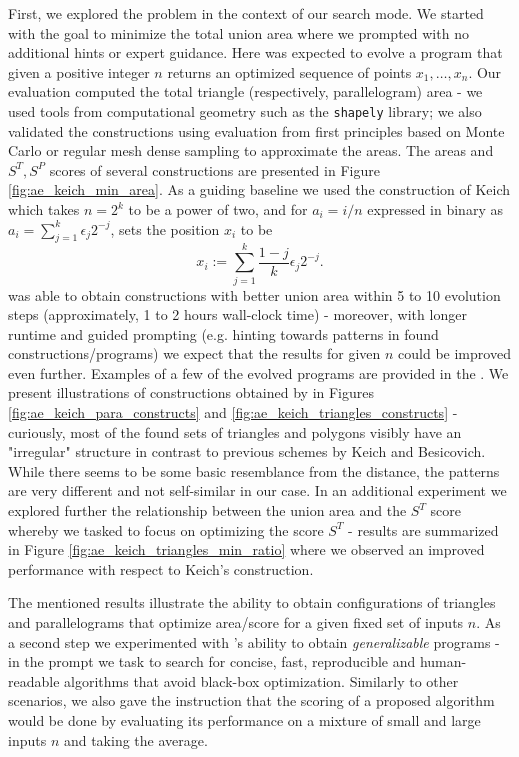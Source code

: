 First, we explored the problem in the context of our search mode. We started with the goal to minimize the total union area where we prompted \AlphaEvolve with no additional hints or expert guidance. Here \AlphaEvolve was expected to evolve a program that given a positive integer $n$ returns an optimized sequence of points $x_1, \dots, x_n$. Our evaluation computed the total triangle (respectively, parallelogram) area - we used tools from computational geometry such as the \texttt{shapely} library; we also validated the constructions using evaluation from first principles based on Monte Carlo or regular mesh dense sampling to approximate the areas. The areas and $S^T, S^P$ scores of several \AlphaEvolve constructions are presented in Figure \ref{fig:ae_keich_min_area}. As a guiding baseline we used the construction of Keich \cite{keich} which takes $n=2^k$ to be a power of two, and for $a_i = i/n$ expressed in binary as $a_i = \sum_{j=1}^k \epsilon_j 2^{-j}$, sets the position $x_i$ to be
$$ x_i := \sum_{j=1}^k \frac{1-j}{k} \epsilon_j 2^{-j}.$$
\AlphaEvolve was able to obtain constructions with better union area within 5 to 10 evolution steps (approximately, 1 to 2 hours wall-clock time) - moreover, with longer runtime and guided prompting (e.g. hinting towards patterns in found constructions/programs) we expect that the results for given $n$ could be improved even further. Examples of a few of the evolved programs are provided in the \Repo. We present illustrations of constructions obtained by \AlphaEvolve in Figures \ref{fig:ae_keich_para_constructs} and \ref{fig:ae_keich_triangles_constructs} - curiously, most of the found sets of triangles and polygons  visibly have an "irregular" structure in contrast to previous schemes by Keich and Besicovich. While there seems to be some basic resemblance from the distance, the patterns are very different and not self-similar in our case. In an additional experiment we explored further the relationship between the union area and the $S^T$ score whereby we tasked \AlphaEvolve to focus on optimizing the score $S^T$ - results are summarized in Figure \ref{fig:ae_keich_triangles_min_ratio} where we observed an improved performance with respect to Keich's construction.

The mentioned results illustrate the ability to obtain configurations of triangles and parallelograms that optimize area/score for a given fixed set of inputs $n$. As a second step we experimented with \AlphaEvolve's ability to obtain \textit{generalizable} programs - in the prompt we task \AlphaEvolve to search for concise, fast, reproducible and human-readable algorithms that avoid black-box optimization. Similarly to other scenarios, we also gave the instruction that the scoring of a proposed algorithm would be done by evaluating its performance on a mixture of small and large inputs $n$ and taking the average.

